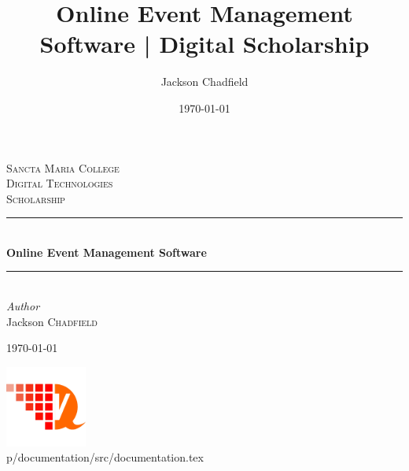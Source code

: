\documentclass[12pt, draft]{report}
\title{Online Event Management Software | Digital Scholarship}
\author{Jackson Chadfield}
\date{\today}
\begin{document}
	\begin{titlepage} %
		\newcommand{\HRule}{\rule{\linewidth}{0.5mm}} %

		\center %



		\textsc{\LARGE Sancta Maria College}\\[1.5cm] %

		\textsc{\Large Digital Technologies}\\[0.5cm] %

		\textsc{\large Scholarship}\\[0.5cm] %


		\HRule\\[0.4cm]

		{\huge\bfseries Online Event Management Software}\\[0.4cm] %

		\HRule\\[1.5cm]


		{\large\textit{Author}}\\
		Jackson \textsc{Chadfield} %


		\vfill\vfill\vfill %

		{\large\today} %


		\vfill\vfill
		\includegraphics[width=0.2\textwidth]{static/logo.png}\\[1cm] %

		p/documentation/src/documentation.tex
		\vfill

	\end{titlepage}
\end{document}
